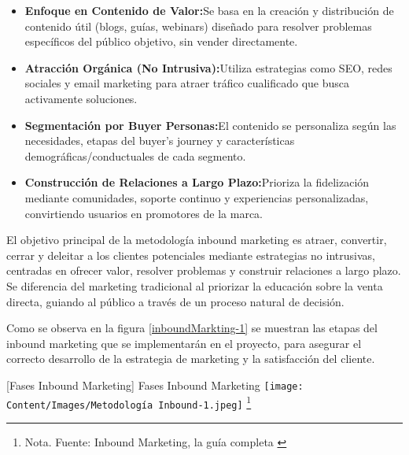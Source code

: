 \begin{itemize}
    \item \textbf{Enfoque en Contenido de Valor:}Se basa en la creación y distribución de contenido útil (blogs, guías, webinars) diseñado para resolver problemas específicos del público objetivo, sin vender directamente.
    \item \textbf{Atracción Orgánica (No Intrusiva):}Utiliza estrategias como SEO, redes sociales y email marketing para atraer tráfico cualificado que busca activamente soluciones.
    \item \textbf{Segmentación por Buyer Personas:}El contenido se personaliza según las necesidades, etapas del buyer's journey y características demográficas/conductuales de cada segmento.
    \item \textbf{Construcción de Relaciones a Largo Plazo:}Prioriza la fidelización mediante comunidades, soporte continuo y experiencias personalizadas, convirtiendo usuarios en promotores de la marca.
\end{itemize}
El objetivo principal de la metodología inbound marketing es atraer, convertir, cerrar y deleitar a los clientes potenciales mediante estrategias no intrusivas, centradas en ofrecer valor, resolver problemas y construir relaciones a largo plazo. Se diferencia del marketing tradicional al priorizar la educación sobre la venta directa, guiando al público a través de un proceso natural de decisión.

Como se observa en la figura \ref{inboundMarkting-1} se muestran las etapas del inbound marketing que se implementarán en el proyecto, para asegurar el correcto desarrollo de la estrategia de marketing y la satisfacción del cliente.



\vspace{2mm}
        \begin{minipage}{0.9\textwidth}
        \centering
        [{Fases Inbound Marketing}]{ Fases Inbound Marketing  }
        \label{inboundMarkting-1}
         \texttt{[image: Content/Images/Metodología Inbound-1.jpeg]}
        \footnote{Nota. \textup{Fuente: Inbound Marketing, la guía completa \cite{InboundMarketing}}}
\end{minipage}

